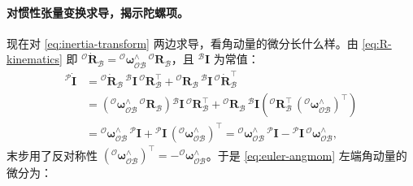 \paragraph{对惯性张量变换求导，揭示陀螺项。}
现在对 \cref{eq:inertia-transform} 两边求导，看角动量的微分长什么样。由 \cref{eq:R-kinematics} 即 ${}^{\mathcal{O}}\dot{\mathbf{R}}_{\mathcal{B}}={}^{\mathcal{O}}\boldsymbol{\omega}_{\mathcal{OB}}^{\wedge}\,{}^{\mathcal{O}}\mathbf{R}_{\mathcal{B}}$，且 ${}^{\mathcal{B}}\mathbf{I}$ 为常值\cite{dicarlo2018cheetah}：
\begin{equation}
\begin{aligned}
  {}^{\mathcal{P}}\dot{\mathbf{I}}
  &={}^{\mathcal{O}}\dot{\mathbf{R}}_{\mathcal{B}}\,{}^{\mathcal{B}}\mathbf{I}\,{}^{\mathcal{O}}\mathbf{R}_{\mathcal{B}}^\top
  +{}^{\mathcal{O}}\mathbf{R}_{\mathcal{B}}\,{}^{\mathcal{B}}\mathbf{I}\,{}^{\mathcal{O}}\dot{\mathbf{R}}_{\mathcal{B}}^\top\\
  &=\left({}^{\mathcal{O}}\boldsymbol{\omega}_{\mathcal{OB}}^{\wedge}\,{}^{\mathcal{O}}\mathbf{R}_{\mathcal{B}}\right){}^{\mathcal{B}}\mathbf{I}\,{}^{\mathcal{O}}\mathbf{R}_{\mathcal{B}}^\top
  +{}^{\mathcal{O}}\mathbf{R}_{\mathcal{B}}\,{}^{\mathcal{B}}\mathbf{I}\left({}^{\mathcal{O}}\mathbf{R}_{\mathcal{B}}^\top\,({}^{\mathcal{O}}\boldsymbol{\omega}_{\mathcal{OB}}^{\wedge})^\top\right)\\
  &={}^{\mathcal{O}}\boldsymbol{\omega}_{\mathcal{OB}}^{\wedge}\,{}^{\mathcal{P}}\mathbf{I}+{}^{\mathcal{P}}\mathbf{I}\,({}^{\mathcal{O}}\boldsymbol{\omega}_{\mathcal{OB}}^{\wedge})^\top
  ={}^{\mathcal{O}}\boldsymbol{\omega}_{\mathcal{OB}}^{\wedge}\,{}^{\mathcal{P}}\mathbf{I}-{}^{\mathcal{P}}\mathbf{I}\,{}^{\mathcal{O}}\boldsymbol{\omega}_{\mathcal{OB}}^{\wedge},
\end{aligned}
\label{eq:inertia-dot}
\end{equation}
末步用了反对称性 $({}^{\mathcal{O}}\boldsymbol{\omega}_{\mathcal{OB}}^{\wedge})^\top=-{}^{\mathcal{O}}\boldsymbol{\omega}_{\mathcal{OB}}^{\wedge}$。于是 \cref{eq:euler-angmom} 左端角动量的微分为\cite{dicarlo2018cheetah}：
